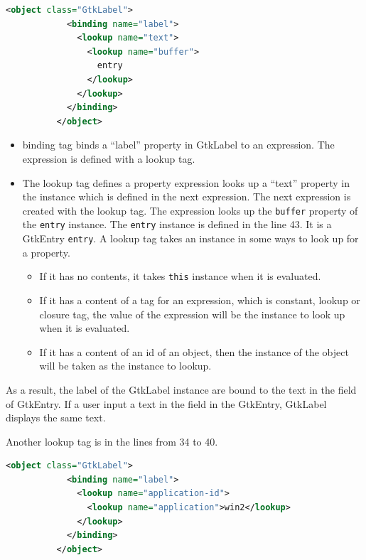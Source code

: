 \begin{lstlisting}[language=XML]
          <object class="GtkLabel">
            <binding name="label">
              <lookup name="text">
                <lookup name="buffer">
                  entry
                </lookup>
              </lookup>
            </binding>
          </object>
\end{lstlisting}

\begin{itemize}
\tightlist
\item
  binding tag binds a ``label'' property in GtkLabel to an expression.
  The expression is defined with a lookup tag.
\item
  The lookup tag defines a property expression looks up a ``text''
  property in the instance which is defined in the next expression. The
  next expression is created with the lookup tag. The expression looks
  up the \passthrough{\lstinline!buffer!} property of the
  \passthrough{\lstinline!entry!} instance. The
  \passthrough{\lstinline!entry!} instance is defined in the line 43. It
  is a GtkEntry \passthrough{\lstinline!entry!}. A lookup tag takes an
  instance in some ways to look up for a property.

  \begin{itemize}
  \tightlist
  \item
    If it has no contents, it takes \passthrough{\lstinline!this!}
    instance when it is evaluated.
  \item
    If it has a content of a tag for an expression, which is constant,
    lookup or closure tag, the value of the expression will be the
    instance to look up when it is evaluated.
  \item
    If it has a content of an id of an object, then the instance of the
    object will be taken as the instance to lookup.
  \end{itemize}
\end{itemize}

As a result, the label of the GtkLabel instance are bound to the text in
the field of GtkEntry. If a user input a text in the field in the
GtkEntry, GtkLabel displays the same text.

Another lookup tag is in the lines from 34 to 40.

\begin{lstlisting}[language=XML]
          <object class="GtkLabel">
            <binding name="label">
              <lookup name="application-id">
                <lookup name="application">win2</lookup>
              </lookup>
            </binding>
          </object>
\end{lstlisting}

